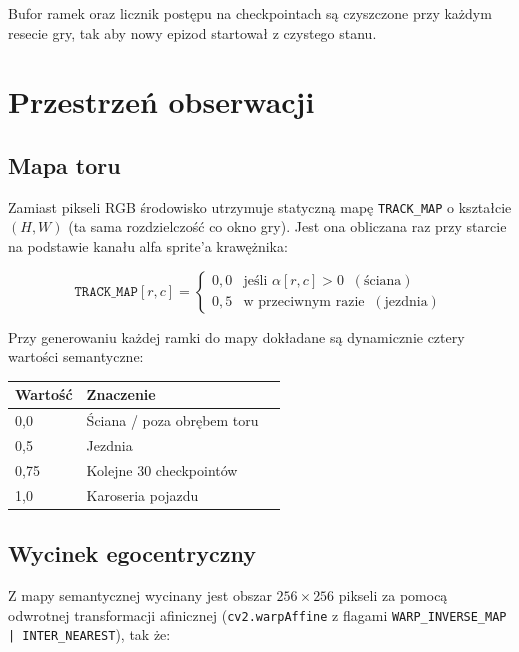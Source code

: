 \documentclass[12pt,a4paper,twocolumn]{article}
\begin{document}
Bufor ramek oraz licznik postępu na checkpointach są czyszczone przy każdym resecie gry, tak aby nowy epizod startował z czystego stanu.

\section{Przestrzeń obserwacji}

\subsection{Mapa toru}

Zamiast pikseli RGB środowisko utrzymuje statyczną mapę \texttt{TRACK\_MAP} o kształcie $(H, W)$ (ta sama rozdzielczość co okno gry).
Jest ona obliczana raz przy starcie na podstawie kanału alfa sprite'a krawężnika:

\begin{equation}
  \texttt{TRACK\_MAP}[r,c] =
  \begin{cases}
    0{,}0 & \text{jeśli } \alpha[r,c] > 0 \;\; (\text{ściana}) \\
    0{,}5 & \text{w przeciwnym razie} \;\; (\text{jezdnia})
  \end{cases}
\end{equation}

Przy generowaniu każdej ramki do mapy dokładane są dynamicznie cztery wartości semantyczne:

\begin{center}
\begin{tabular}{@{}lll@{}}
  \toprule
  Wartość & Znaczenie \\
  \midrule
  0,0 & Ściana / poza obrębem toru \\
  0,5 & Jezdnia \\
  0,75 & Kolejne 30 checkpointów \\
  1,0 & Karoseria pojazdu \\
  \bottomrule
\end{tabular}
\end{center}

\subsection{Wycinek egocentryczny}

Z mapy semantycznej wycinany jest obszar $256\times256$ pikseli za pomocą odwrotnej transformacji afinicznej (\texttt{cv2.warpAffine} z flagami \texttt{WARP\_INVERSE\_MAP | INTER\_NEAREST}), tak że:
\end{document}

